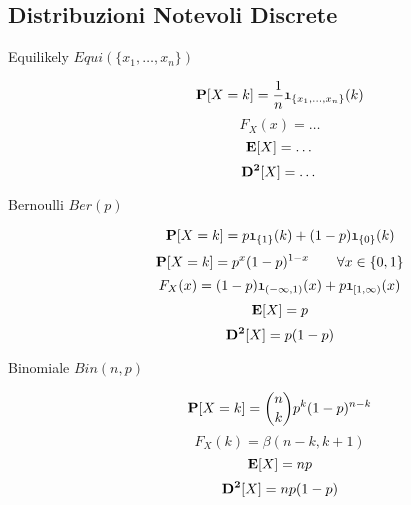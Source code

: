 \subsection{Distribuzioni Notevoli Discrete}
\begin{description}
	
	\item[Equilikely $Equi(\{x_{1},\dots,x_{n}\})$]
		\begin{equation}
		\mathbf{P}[X=k]=\frac{1}{n}\mathfrak{1}_{\{x_{1},\dots,x_{n}\}}(k)
		\end{equation}
		\begin{equation}
		F_{X}(x)=\dots
		\end{equation}
		\begin{equation}
		\mathbf{E}[X]=\dots
		\end{equation}
		\begin{equation}
		\mathbf{D^{2}}[X]=\dots
		\end{equation}
	
	\item[Bernoulli $Ber(p)$]
		\begin{equation}
		\mathbf{P}[X=k] = p\mathfrak{1}_{\{1\}}(k)+(1-p)\mathfrak{1}_{\{0\}}(k)
		\end{equation}
		\begin{equation}
		\mathbf{P}[X=k]=p^{x}(1-p)^{1-x}
		\qquad\forall x\in\{0,1\}
		\end{equation}
		\begin{equation}
		F_{X}(x)=(1-p)\mathfrak{1}_{(-\infty,1)}(x)+p\mathfrak{1}_{[1,\infty)}(x)
		\end{equation}
		\begin{equation}
		\mathbf{E}[X]=p
		\end{equation}
		\begin{equation}
		\mathbf{D^{2}}[X]=p(1-p)
		\end{equation}
	
	\item[Binomiale $Bin(n,p)$]
		\begin{equation}
		\mathbf{P}[X=k]=\binom{n}{k}p^{k}(1-p)^{n-k}
		\end{equation}
		\begin{equation}
		F_{X}(k)=\beta(n-k,k+1)
		\end{equation}
		\begin{equation}
		\mathbf{E}[X]=np
		\end{equation}
		\begin{equation}
		\mathbf{D^{2}}[X]=np(1-p)
		\end{equation}
	

\end{description}
